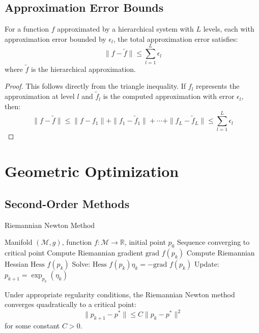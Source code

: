 \subsection{Approximation Error Bounds}

\begin{theorem}
\label{thm:hierarchical_approximation_error}
For a function $f$ approximated by a hierarchical system with $L$ levels, each with approximation error bounded by $\epsilon_l$, the total approximation error satisfies:
$$\|f - \tilde{f}\| \leq \sum_{l=1}^L \epsilon_l$$
where $\tilde{f}$ is the hierarchical approximation.
\end{theorem}

\begin{proof}
This follows directly from the triangle inequality. If $f_l$ represents the approximation at level $l$ and $\tilde{f}_l$ is the computed approximation with error $\epsilon_l$, then:
$$\|f - \tilde{f}\| \leq \|f - f_1\| + \|f_1 - \tilde{f}_1\| + \cdots + \|f_L - \tilde{f}_L\| \leq \sum_{l=1}^L \epsilon_l$$
\end{proof}

\section{Geometric Optimization}

\subsection{Second-Order Methods}

\begin{algorithm}
\caption{Riemannian Newton Method}
\begin{algorithmic}[1]
\Require Manifold $(\mathcal{M}, g)$, function $f: \mathcal{M} \to \mathbb{R}$, initial point $p_0$
\Ensure Sequence converging to critical point
    \State Compute Riemannian gradient $\text{grad } f(p_k)$
    \State Compute Riemannian Hessian $\text{Hess } f(p_k)$
    \State Solve: $\text{Hess } f(p_k) \eta_k = -\text{grad } f(p_k)$
    \State Update: $p_{k+1} = \exp_{p_k}(\eta_k)$
\EndFor
\end{algorithmic}
\end{algorithm}

\begin{theorem}
\label{thm:riemannian_newton_convergence}
Under appropriate regularity conditions, the Riemannian Newton method converges quadratically to a critical point:
$$\|p_{k+1} - p^*\| \leq C \|p_k - p^*\|^2$$
for some constant $C > 0$.
\end{theorem}

